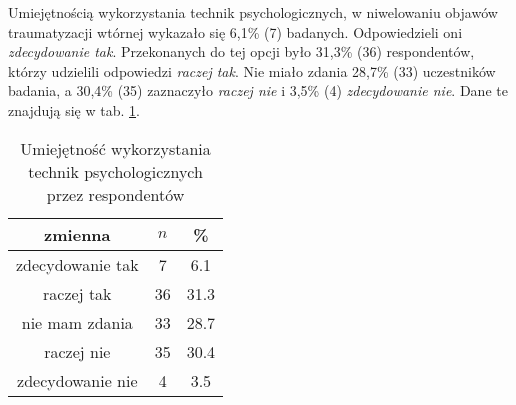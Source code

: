 
Umiejętnością wykorzystania technik psychologicznych, w niwelowaniu objawów traumatyzacji wtórnej wykazało się 6,1\% (7) badanych. Odpowiedzieli oni \textit{zdecydowanie tak}. Przekonanych do tej opcji było 31,3\% (36) respondentów, którzy udzielili odpowiedzi \textit{raczej tak}. Nie miało zdania 28,7\% (33) uczestników badania, a  30,4\% (35) zaznaczyło \textit{raczej nie} i 3,5\% (4) \textit{zdecydowanie nie}. Dane te znajdują się w  tab. \ref{tab:Q12}.

\begin{table}[H]
\caption{Umiejętność wykorzystania technik psychologicznych przez respondentów}
\centering
\begin{tabular}{ | c | c | c |}
\hline
zmienna & $n$ & \% \\
\hline
zdecydowanie tak  &  7  & 6.1 \\
\hline
raczej tak  &  36  & 31.3\\
\hline
nie mam zdania  &  33  & 28.7 \\
\hline
raczej nie  &  35  & 30.4 \\
\hline
zdecydowanie nie  &  4  & 3.5\\
\hline
\end{tabular}
\label{tab:Q12}
\end{table}
